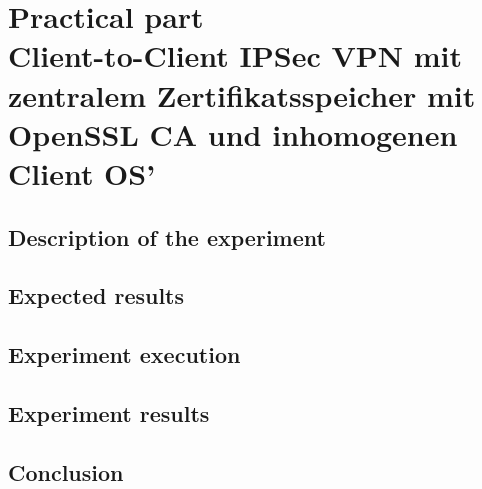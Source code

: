 \documentclass[a4paper]{report}
\begin{document}
\chapter[Practical part\\Client-to-Client IPSec VPN mit zentralem Zertifikatsspeicher mit OpenSSL CA und inhomogenen Client OS]{Practical part\\\large{Client-to-Client IPSec VPN mit zentralem Zertifikatsspeicher mit OpenSSL CA und inhomogenen Client OS'}}
\label{ch:Practical}

\section{Description of the experiment}
\label{sec:ExpDesc}

\section{Expected results}
\label{sec:ExpectedResult}

\section{Experiment execution}
\label{sec:ExpExec}

\section{Experiment results}
\label{sec:ExpRes}

\section{Conclusion}
\label{sec:Conc}

\newpage

\printbibliography
\end{document}
